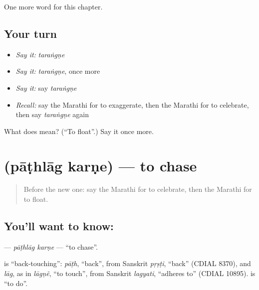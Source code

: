 \begin{grammarlens}[title={What you've built}]
One more word for this chapter.
\end{grammarlens}

\subsection*{Your turn}
\begin{itemize}
\raggedright
  \item \emph{Say it:} \emph{taraṅgṇe}
  \item \emph{Say it:} \emph{taraṅgṇe}, once more
  \item \emph{Say it:} say \emph{taraṅgṇe}
  \item \emph{Recall:} say the Marathi for to exaggerate, then the Marathi for to celebrate, then say \emph{taraṅgṇe} again
\end{itemize}

\begin{tcolorbox}[breakable,colback=teal!4,colframe=teal!35!black,title={Before you move on}]
What does  mean? (\textquotedblleft{}To float\textquotedblright{}.) Say it once more.
\end{tcolorbox}
\section[\texorpdfstring{\mr{पाठलाग} \mr{करणे} (pāṭhlāg karṇe)}{पाठलाग करणे (pāṭhlāg karṇe)}]{  (pāṭhlāg karṇe) — to chase}

\label{lesson:MR-C227-pathlag-karne}



\begin{quote}
Before the new one: say the Marathi for to celebrate, then the Marathi for to float.
\end{quote}

\subsection*{You'll want to know:  }
\textbf{ } — \emph{pāṭhlāg karṇe} — \textquotedblleft{}to chase\textquotedblright{}.

\begin{cousinweb}
\textbf{} is \textquotedblleft{}back-touching\textquotedblright{}: \emph{pāṭh}, \textquotedblleft{}back\textquotedblright{}, from Sanskrit \emph{pṛṣṭi}, \textquotedblleft{}back\textquotedblright{} (CDIAL 8370), and \emph{lāg}, as in \emph{lāgṇẽ}, \textquotedblleft{}to touch\textquotedblright{}, from Sanskrit \emph{lagyati}, \textquotedblleft{}adheres to\textquotedblright{} (CDIAL 10895). \textbf{} is \textquotedblleft{}to do\textquotedblright{}.
\end{cousinweb}

